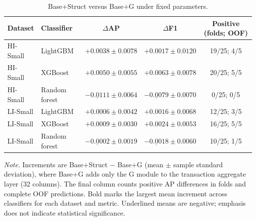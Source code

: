 \begin{table}[htbp]
\centering
\small
\caption{Base+Struct versus Base+G under fixed parameters.}
\label{tab:graphstats}
\begin{threeparttable}
\begin{tabular}{llccc}
\toprule
Dataset & Classifier & $\Delta$AP & $\Delta$F1 & Positive (folds; OOF) \\
\midrule
HI-Small & LightGBM & $+0.0038 \pm 0.0078$ & $+0.0017 \pm 0.0120$ & 19/25; 4/5 \\
HI-Small & XGBoost & $\mathbf{+0.0050} \pm 0.0055$ & $\mathbf{+0.0063} \pm 0.0078$ & 20/25; 5/5 \\
HI-Small & Random forest & $\underline{-0.0111} \pm 0.0064$ & $\underline{-0.0079} \pm 0.0070$ & 0/25; 0/5 \\
LI-Small & LightGBM & $+0.0006 \pm 0.0042$ & $+0.0016 \pm 0.0068$ & 12/25; 3/5 \\
LI-Small & XGBoost & $\mathbf{+0.0009} \pm 0.0030$ & $\mathbf{+0.0024} \pm 0.0053$ & 16/25; 5/5 \\
LI-Small & Random forest & $\underline{-0.0002} \pm 0.0019$ & $\underline{-0.0018} \pm 0.0060$ & 10/25; 1/5 \\
\bottomrule
\end{tabular}
\begin{tablenotes}[flushleft]
\footnotesize
\setlength{\labelsep}{0pt}\item[] \textit{Note.} Increments are Base+Struct $-$ Base+G (mean $\pm$ sample standard deviation), where Base+G adds only the G module to the transaction aggregate layer (32 columns). The final column counts positive AP differences in folds and complete OOF predictions. Bold marks the largest mean increment across classifiers for each dataset and metric. Underlined means are negative; emphasis does not indicate statistical significance.
\end{tablenotes}
\end{threeparttable}
\end{table}
